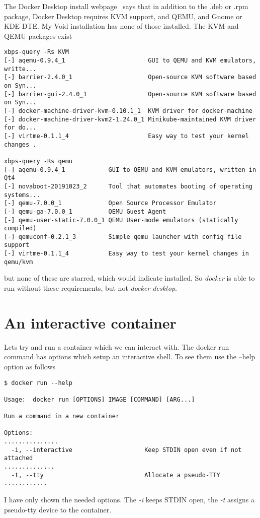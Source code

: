 \documentclass{article}  %
\begin{document}
The Docker Desktop install webpage~\cite{dock:01} says that in addition to the .deb or .rpm package, Docker Desktop requires KVM support, and QEMU, and Gnome or KDE DTE. My Void installation has none of those installed. The KVM and QEMU packages exist
\begin{verbatim}
xbps-query -Rs KVM
[-] aqemu-0.9.4_1                       GUI to QEMU and KVM emulators, writte...
[-] barrier-2.4.0_1                     Open-source KVM software based on Syn...
[-] barrier-gui-2.4.0_1                 Open-source KVM software based on Syn...
[-] docker-machine-driver-kvm-0.10.1_1  KVM driver for docker-machine
[-] docker-machine-driver-kvm2-1.24.0_1 Minikube-maintained KVM driver for do...
[-] virtme-0.1.1_4                      Easy way to test your kernel changes .

xbps-query -Rs qemu
[-] aqemu-0.9.4_1            GUI to QEMU and KVM emulators, written in Qt4
[-] novaboot-20191023_2      Tool that automates booting of operating systems...
[-] qemu-7.0.0_1             Open Source Processor Emulator
[-] qemu-ga-7.0.0_1          QEMU Guest Agent
[-] qemu-user-static-7.0.0_1 QEMU User-mode emulators (statically compiled)
[-] qemuconf-0.2.1_3         Simple qemu launcher with config file support
[-] virtme-0.1.1_4           Easy way to test your kernel changes in qemu/kvm
\end{verbatim}
but none of these are starred, which would indicate installed. 
So {\em docker} is able to run without these requirements, but not {\em docker desktop}.

\section{An interactive container}
Lets try and run a container which we can interact with. The docker run command has options which setup an interactive shell. To see them use the --help option as follows
\begin{verbatim}
$ docker run --help

Usage:  docker run [OPTIONS] IMAGE [COMMAND] [ARG...]

Run a command in a new container

Options:
...............
  -i, --interactive                    Keep STDIN open even if not attached
..............
  -t, --tty                            Allocate a pseudo-TTY
............
\end{verbatim}
I have only shown the needed options. The {\em -i} keeps STDIN open, the {\em -t} assigns a pseudo-tty device to the container.
\end{document}
